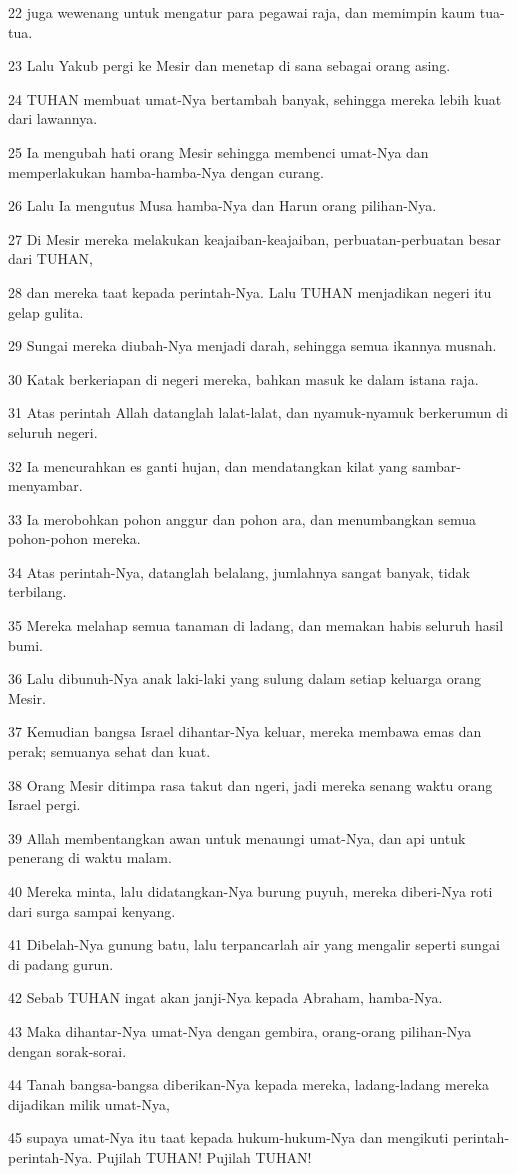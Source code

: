 \par 22 juga wewenang untuk mengatur para pegawai raja, dan memimpin kaum tua-tua.
\par 23 Lalu Yakub pergi ke Mesir dan menetap di sana sebagai orang asing.
\par 24 TUHAN membuat umat-Nya bertambah banyak, sehingga mereka lebih kuat dari lawannya.
\par 25 Ia mengubah hati orang Mesir sehingga membenci umat-Nya dan memperlakukan hamba-hamba-Nya dengan curang.
\par 26 Lalu Ia mengutus Musa hamba-Nya dan Harun orang pilihan-Nya.
\par 27 Di Mesir mereka melakukan keajaiban-keajaiban, perbuatan-perbuatan besar dari TUHAN,
\par 28 dan mereka taat kepada perintah-Nya. Lalu TUHAN menjadikan negeri itu gelap gulita.
\par 29 Sungai mereka diubah-Nya menjadi darah, sehingga semua ikannya musnah.
\par 30 Katak berkeriapan di negeri mereka, bahkan masuk ke dalam istana raja.
\par 31 Atas perintah Allah datanglah lalat-lalat, dan nyamuk-nyamuk berkerumun di seluruh negeri.
\par 32 Ia mencurahkan es ganti hujan, dan mendatangkan kilat yang sambar-menyambar.
\par 33 Ia merobohkan pohon anggur dan pohon ara, dan menumbangkan semua pohon-pohon mereka.
\par 34 Atas perintah-Nya, datanglah belalang, jumlahnya sangat banyak, tidak terbilang.
\par 35 Mereka melahap semua tanaman di ladang, dan memakan habis seluruh hasil bumi.
\par 36 Lalu dibunuh-Nya anak laki-laki yang sulung dalam setiap keluarga orang Mesir.
\par 37 Kemudian bangsa Israel dihantar-Nya keluar, mereka membawa emas dan perak; semuanya sehat dan kuat.
\par 38 Orang Mesir ditimpa rasa takut dan ngeri, jadi mereka senang waktu orang Israel pergi.
\par 39 Allah membentangkan awan untuk menaungi umat-Nya, dan api untuk penerang di waktu malam.
\par 40 Mereka minta, lalu didatangkan-Nya burung puyuh, mereka diberi-Nya roti dari surga sampai kenyang.
\par 41 Dibelah-Nya gunung batu, lalu terpancarlah air yang mengalir seperti sungai di padang gurun.
\par 42 Sebab TUHAN ingat akan janji-Nya kepada Abraham, hamba-Nya.
\par 43 Maka dihantar-Nya umat-Nya dengan gembira, orang-orang pilihan-Nya dengan sorak-sorai.
\par 44 Tanah bangsa-bangsa diberikan-Nya kepada mereka, ladang-ladang mereka dijadikan milik umat-Nya,
\par 45 supaya umat-Nya itu taat kepada hukum-hukum-Nya dan mengikuti perintah-perintah-Nya. Pujilah TUHAN! Pujilah TUHAN!

